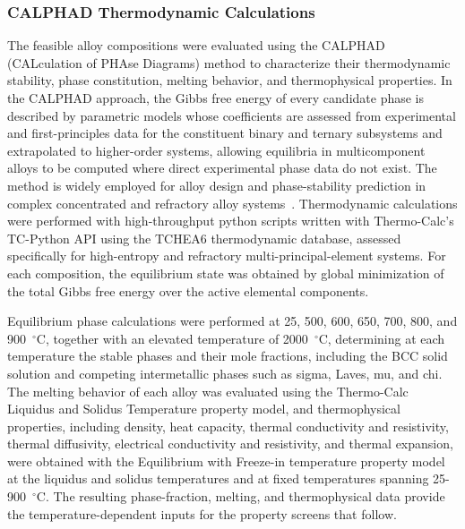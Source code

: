 \subsubsection{CALPHAD Thermodynamic Calculations}

The feasible alloy compositions were evaluated using the CALPHAD
(CALculation of PHAse Diagrams) method to characterize their thermodynamic
stability, phase constitution, melting behavior, and thermophysical
properties. In the CALPHAD approach, the Gibbs free energy of every candidate
phase is described by parametric models whose coefficients are assessed from
experimental and first-principles data for the constituent binary and ternary
subsystems and extrapolated to higher-order systems, allowing equilibria in
multicomponent alloys to be computed where direct experimental phase data do
not exist. The method is widely employed for alloy design and phase-stability
prediction in complex concentrated and refractory alloy
systems~\cite{li2023calphad,conway2022thermodynamic}. Thermodynamic
calculations were performed with high-throughput python scripts written with Thermo-Calc's TC-Python API using the TCHEA6 thermodynamic
database, assessed specifically for high-entropy and refractory
multi-principal-element systems. For each composition, the equilibrium state
was obtained by global minimization of the total Gibbs free energy over the
active elemental components.

Equilibrium phase calculations were performed at 25, 500, 600, 650, 700, 800,
and 900~$^{\circ}\mathrm{C}$, together with an elevated temperature of
2000~$^{\circ}\mathrm{C}$, determining at each temperature the stable phases
and their mole fractions, including the BCC solid solution and competing
intermetallic phases such as sigma, Laves, mu, and chi. The melting behavior
of each alloy was evaluated using the Thermo-Calc Liquidus and Solidus
Temperature property model, and thermophysical properties, including density, heat
capacity, thermal conductivity and resistivity, thermal diffusivity,
electrical conductivity and resistivity, and thermal expansion, were obtained
with the Equilibrium with Freeze-in temperature property model at the liquidus
and solidus temperatures and at fixed temperatures spanning
25-900~$^{\circ}\mathrm{C}$. The resulting phase-fraction, melting, and
thermophysical data provide the temperature-dependent inputs for the property
screens that follow.


